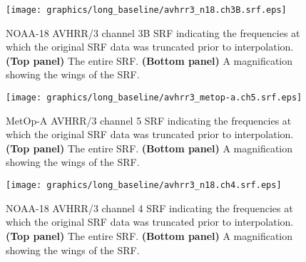 \begin{figure}[htp]
  \centering
  \texttt{[image: graphics/long\_baseline/avhrr3\_n18.ch3B.srf.eps]}
  \caption{NOAA-18 AVHRR/3 channel 3B SRF indicating the frequencies at which the original SRF data was truncated prior to interpolation. \textbf{(Top panel)} The entire SRF. \textbf{(Bottom panel)} A magnification showing the wings of the SRF.}
  \label{fig:avhrr3_n18.ch3b.srf}
\end{figure}

\begin{figure}[htp]
  \centering
  \texttt{[image: graphics/long\_baseline/avhrr3\_metop-a.ch5.srf.eps]}
  \caption{MetOp-A AVHRR/3 channel 5 SRF indicating the frequencies at which the original SRF data was truncated prior to interpolation. \textbf{(Top panel)} The entire SRF. \textbf{(Bottom panel)} A magnification showing the wings of the SRF.}
  \label{fig:avhrr3_metop-a.ch5.srf}
\end{figure}

\begin{figure}[htp]
  \centering
  \texttt{[image: graphics/long\_baseline/avhrr3\_n18.ch4.srf.eps]}
  \caption{NOAA-18 AVHRR/3 channel 4 SRF indicating the frequencies at which the original SRF data was truncated prior to interpolation. \textbf{(Top panel)} The entire SRF. \textbf{(Bottom panel)} A magnification showing the wings of the SRF.}
  \label{fig:avhrr3_n18.ch4.srf}
\end{figure}

